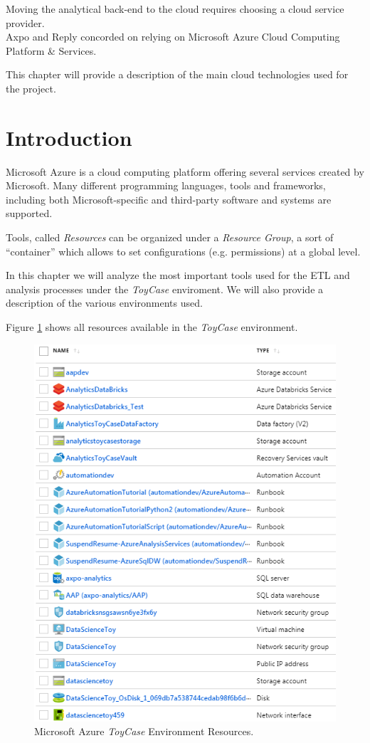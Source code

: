 \label{section:azure}
Moving the analytical back-end to the cloud requires choosing a cloud service provider.\\
Axpo and Reply concorded on relying on {Microsoft Azure Cloud Computing Platform \& Services}.

This chapter will provide a description of the main cloud technologies used for the project.

\section{Introduction}

Microsoft Azure is a cloud computing platform offering several services created by Microsoft.
Many different programming languages, tools and frameworks, including both Microsoft-specific and third-party software and systems are supported\cite{bib:azure:wikipedia}.

Tools, called \textit{Resources} can be organized under a \textit{Resource Group}, a sort of ``container'' which allows to set configurations (e.g. permissions) at a global level.

In this chapter we will analyze the most important tools used for the ETL and analysis processes under the \textit{ToyCase} enviroment.
We will also provide a description of the various environments used.

Figure \ref{fig:azure_resources} shows all resources available in the \textit{ToyCase} environment.

\begin{figure}
    \centering
    \includegraphics[width=.7\textwidth]{res/azure/toycase.png}
    \caption{Microsoft Azure \textit{ToyCase} Environment Resources.}
    \label{fig:azure_resources}
\end{figure}

